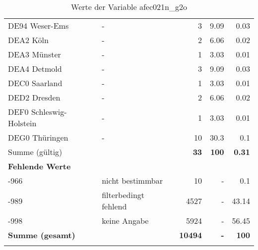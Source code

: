 \begin{longtable}{Xlrrr}
     \multicolumn{1}{X}{DE94 Weser-Ems} &
     - &
     \num{3} &
     \num[round-mode=places,round-precision=2]{9.09} &
     \num[round-mode=places,round-precision=2]{0.03} \\

     \multicolumn{1}{X}{DEA2 Köln} &
     - &
     \num{2} &
     \num[round-mode=places,round-precision=2]{6.06} &
     \num[round-mode=places,round-precision=2]{0.02} \\

     \multicolumn{1}{X}{DEA3 Münster} &
     - &
     \num{1} &
     \num[round-mode=places,round-precision=2]{3.03} &
     \num[round-mode=places,round-precision=2]{0.01} \\

     \multicolumn{1}{X}{DEA4 Detmold} &
     - &
     \num{3} &
     \num[round-mode=places,round-precision=2]{9.09} &
     \num[round-mode=places,round-precision=2]{0.03} \\

     \multicolumn{1}{X}{DEC0 Saarland} &
     - &
     \num{1} &
     \num[round-mode=places,round-precision=2]{3.03} &
     \num[round-mode=places,round-precision=2]{0.01} \\

     \multicolumn{1}{X}{DED2 Dresden} &
     - &
     \num{2} &
     \num[round-mode=places,round-precision=2]{6.06} &
     \num[round-mode=places,round-precision=2]{0.02} \\

     \multicolumn{1}{X}{DEF0 Schleswig-Holstein} &
     - &
     \num{1} &
     \num[round-mode=places,round-precision=2]{3.03} &
     \num[round-mode=places,round-precision=2]{0.01} \\

     \multicolumn{1}{X}{DEG0 Thüringen} &
     - &
     \num{10} &
     \num[round-mode=places,round-precision=2]{30.3} &
     \num[round-mode=places,round-precision=2]{0.1} \\
     \midrule
      \multicolumn{2}{l}{Summe (gültig)} & \textbf{\num{33}} &
      \textbf{\num{100}} &
         \textbf{\num[round-mode=places,round-precision=2]{0.31}} \\
     \multicolumn{5}{l}{\textbf{Fehlende Werte}}\\
       -966 & nicht bestimmbar & \num{10} & - & \num[round-mode=places,round-precision=2]{0.1} \\

       -989 & filterbedingt fehlend & \num{4527} & - & \num[round-mode=places,round-precision=2]{43.14} \\

       -998 & keine Angabe & \num{5924} & - & \num[round-mode=places,round-precision=2]{56.45} \\

     \midrule
     \multicolumn{2}{l}{\textbf{Summe (gesamt)}} & \textbf{\num{10494}} & \textbf{-} & \textbf{\num{100}} \\
     \bottomrule
     \caption{Werte der Variable afec021n\_g2o}
     \end{longtable}
     
